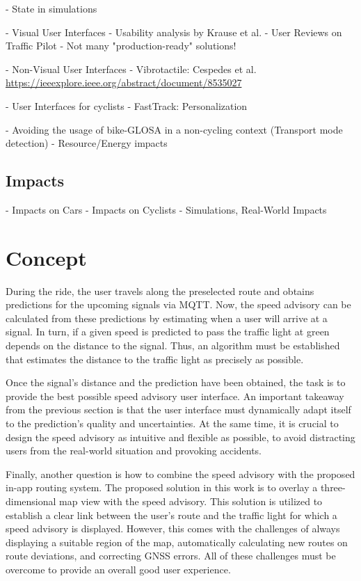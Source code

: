 - State in simulations

- Visual User Interfaces
- Usability analysis by Krause et al.
- User Reviews on Traffic Pilot
- Not many "production-ready" solutions!

- Non-Visual User Interfaces
- Vibrotactile: Cespedes et al. \url{https://ieeexplore.ieee.org/abstract/document/8535027}

- User Interfaces for cyclists
- FastTrack: Personalization

- Avoiding the usage of bike-GLOSA in a non-cycling context (Transport mode detection)
- Resource/Energy impacts

\subsection{Impacts}

- Impacts on Cars
- Impacts on Cyclists
- Simulations, Real-World Impacts

\section{Concept}

During the ride, the user travels along the preselected route and obtains predictions for the upcoming signals via MQTT. Now, the speed advisory can be calculated from these predictions by estimating when a user will arrive at a signal. In turn, if a given speed is predicted to pass the traffic light at green depends on the distance to the signal. Thus, an algorithm must be established that estimates the distance to the traffic light as precisely as possible.

Once the signal's distance and the prediction have been obtained, the task is to provide the best possible speed advisory user interface. An important takeaway from the previous section is that the user interface must dynamically adapt itself to the prediction's quality and uncertainties. At the same time, it is crucial to design the speed advisory as intuitive and flexible as possible, to avoid distracting users from the real-world situation and provoking accidents.

Finally, another question is how to combine the speed advisory with the proposed in-app routing system. The proposed solution in this work is to overlay a three-dimensional map view with the speed advisory. This solution is utilized to establish a clear link between the user's route and the traffic light for which a speed advisory is displayed. However, this comes with the challenges of always displaying a suitable region of the map, automatically calculating new routes on route deviations, and correcting GNSS errors. All of these challenges must be overcome to provide an overall good user experience.

